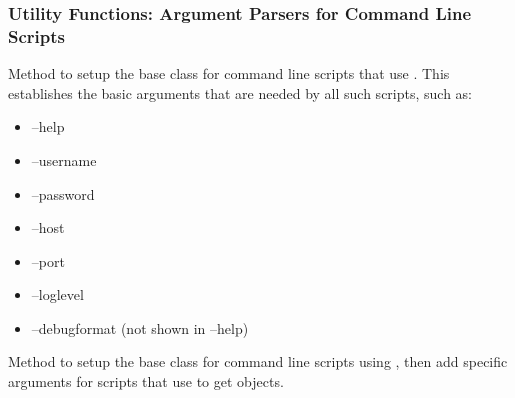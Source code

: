 \documentclass[letterpaper,10pt,english]{sphinxmanual}
\begin{document}
\subsubsection{Utility Functions: Argument Parsers for Command Line Scripts}
\label{pytan.utils:utility-functions-argument-parsers-for-command-line-scripts}

\begin{fulllineitems}
\label{pytan.utils:pytan.utils.setup_parser}
Method to setup the base {\hyperref[pytan.utils:pytan.utils.CustomArgParse]{}} class for command line scripts that use {\hyperref[pytan:module-pytan]{}}. This establishes the basic arguments that are needed by all such scripts, such as:
\begin{itemize}
\item {} 
--help

\item {} 
--username

\item {} 
--password

\item {} 
--host

\item {} 
--port

\item {} 
--loglevel

\item {} 
--debugformat (not shown in --help)

\end{itemize}

\end{fulllineitems}


\begin{fulllineitems}
\label{pytan.utils:pytan.utils.setup_get_object_argparser}
Method to setup the base {\hyperref[pytan.utils:pytan.utils.CustomArgParse]{}} class for command line scripts using {\hyperref[pytan.utils:pytan.utils.setup_parser]{}}, then add specific arguments for scripts that use {\hyperref[pytan:module-pytan]{}} to get objects.

\end{fulllineitems}
\end{document}
